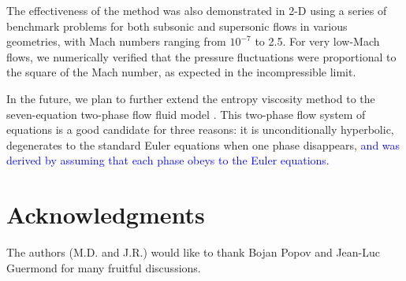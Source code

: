 \documentclass[preprint,10pt]{elsarticle}
\newcommand{\tcb}[1]{\textcolor{blue}{#1}}
\begin{document}
The effectiveness of the method was also demonstrated in 2-D using a series of benchmark problems
for both subsonic and supersonic flows in various geometries, with Mach numbers ranging from $10^{-7}$ to 
2.5. For very low-Mach flows, we numerically verified that the pressure fluctuations were proportional to 
the square of the Mach number, as expected in the incompressible limit.

In the future, we plan to further extend the entropy viscosity method to the seven-equation two-phase flow fluid model \cite{SEM}. 
This two-phase flow system of equations is a good candidate for three reasons: it is unconditionally hyperbolic, degenerates to the standard Euler equations when one phase disappears, \tcb{and was derived by assuming that each phase obeys to the Euler equations.}


\section*{Acknowledgments} 
The authors (M.D. and J.R.) would like to thank Bojan Popov and Jean-Luc Guermond for many fruitful discussions.  


\newpage
\appendix
\end{document}
